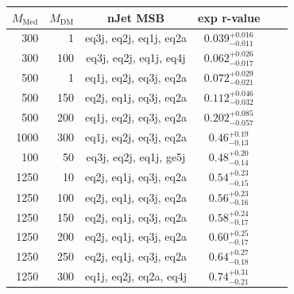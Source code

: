 \begin{table}
  \centering
  \begin{tabular}{rrcccc}
    \hline\hline
    $M_{\text{Med}}$ & $M_{\text{DM}}$ & nJet MSB & exp r-value \\
    \hline
      300 &   1 & eq3j, eq2j, eq1j, eq2a & $0.039_{-0.011}^{+0.016}$ \\ %
      300 & 100 & eq3j, eq2j, eq1j, eq4j & $0.062_{-0.017}^{+0.026}$ \\ %
      500 &   1 & eq1j, eq2j, eq3j, eq2a & $0.072_{-0.021}^{+0.029}$ \\ %
      500 & 150 & eq2j, eq1j, eq3j, eq2a & $0.112_{-0.032}^{+0.046}$ \\ %
      500 & 200 & eq1j, eq2j, eq3j, eq2a & $0.202_{-0.057}^{+0.085}$ \\ %
     1000 & 300 & eq1j, eq2j, eq3j, eq2a & $0.46_{-0.13}^{+0.19}$    \\ %
      100 &  50 & eq3j, eq2j, eq1j, ge5j & $0.48_{-0.14}^{+0.20}$    \\ %
     1250 &  10 & eq2j, eq1j, eq3j, eq2a & $0.54_{-0.15}^{+0.23}$    \\ %
     1250 & 100 & eq2j, eq1j, eq3j, eq2a & $0.56_{-0.16}^{+0.23}$    \\ %
     1250 & 150 & eq2j, eq1j, eq3j, eq2a & $0.58_{-0.17}^{+0.24}$    \\ %
     1250 & 200 & eq2j, eq1j, eq3j, eq2a & $0.60_{-0.17}^{+0.25}$    \\ %
     1250 & 250 & eq2j, eq1j, eq3j, eq2a & $0.64_{-0.18}^{+0.27}$    \\ %
     1250 & 300 & eq1j, eq2j, eq2a, eq4j & $0.74_{-0.21}^{+0.31}$    \\ %

\end{tabular}
\end{table}
